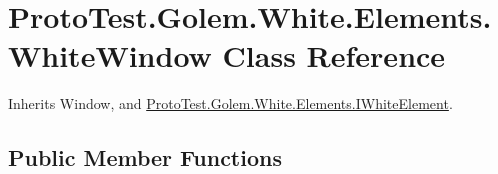 \hypertarget{class_proto_test_1_1_golem_1_1_white_1_1_elements_1_1_white_window}{\section{Proto\-Test.\-Golem.\-White.\-Elements.\-White\-Window Class Reference}
\label{class_proto_test_1_1_golem_1_1_white_1_1_elements_1_1_white_window}
}


Inherits Window, and \hyperlink{interface_proto_test_1_1_golem_1_1_white_1_1_elements_1_1_i_white_element}{Proto\-Test.\-Golem.\-White.\-Elements.\-I\-White\-Element}.

\subsection*{Public Member Functions}
